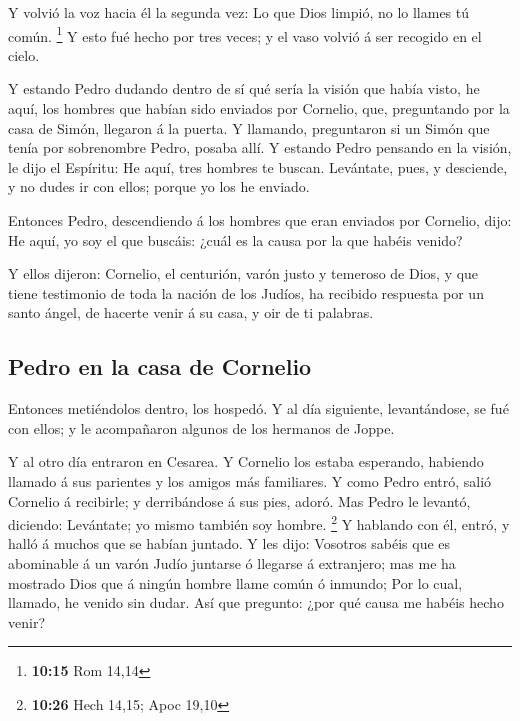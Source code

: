  Y volvió la voz hacia él la segunda vez: Lo que Dios
limpió, no lo llames tú común. \footnote{\textbf{10:15} Rom 14,14}
 Y esto fué hecho por tres veces; y el vaso volvió á ser
recogido en el cielo.

 Y estando Pedro dudando dentro de sí qué sería la visión
que había visto, he aquí, los hombres que habían sido enviados por
Cornelio, que, preguntando por la casa de Simón, llegaron á la puerta.
 Y llamando, preguntaron si un Simón que tenía por
sobrenombre Pedro, posaba allí.  Y estando Pedro pensando
en la visión, le dijo el Espíritu: He aquí, tres hombres te buscan.
 Levántate, pues, y desciende, y no dudes ir con ellos;
porque yo los he enviado.

 Entonces Pedro, descendiendo á los hombres que eran
enviados por Cornelio, dijo: He aquí, yo soy el que buscáis: ¿cuál es la
causa por la que habéis venido?

 Y ellos dijeron: Cornelio, el centurión, varón justo y
temeroso de Dios, y que tiene testimonio de toda la nación de los
Judíos, ha recibido respuesta por un santo ángel, de hacerte venir á su
casa, y oir de ti palabras.

\hypertarget{pedro-en-la-casa-de-cornelio}{%
\subsection{Pedro en la casa de
Cornelio}\label{pedro-en-la-casa-de-cornelio}}

 Entonces metiéndolos dentro, los hospedó. Y al día
siguiente, levantándose, se fué con ellos; y le acompañaron algunos de
los hermanos de Joppe.

 Y al otro día entraron en Cesarea. Y Cornelio los estaba
esperando, habiendo llamado á sus parientes y los amigos más familiares.
 Y como Pedro entró, salió Cornelio á recibirle; y
derribándose á sus pies, adoró.  Mas Pedro le levantó,
diciendo: Levántate; yo mismo también soy hombre. \footnote{\textbf{10:26}
  Hech 14,15; Apoc 19,10}  Y hablando con él, entró, y
halló á muchos que se habían juntado.  Y les dijo:
Vosotros sabéis que es abominable á un varón Judío juntarse ó llegarse á
extranjero; mas me ha mostrado Dios que á ningún hombre llame común ó
inmundo;  Por lo cual, llamado, he venido sin dudar. Así
que pregunto: ¿por qué causa me habéis hecho venir?

